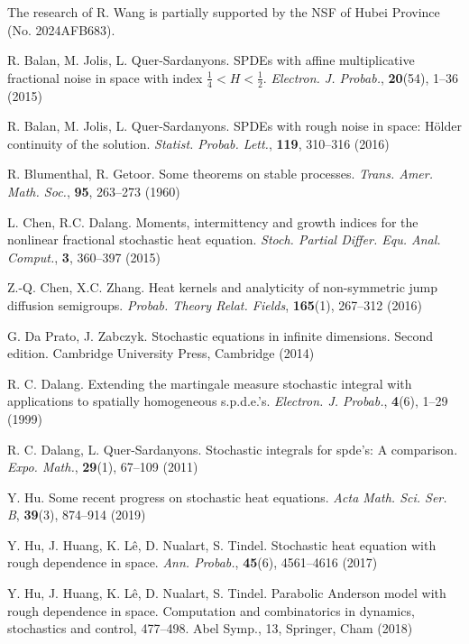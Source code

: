 \documentclass[11pt,reqno]{amsart}
\numberwithin{equation}{section}
\newcommand{\1}{{\bf 1}}
\newcommand{\2}{{\bf 2}}
\begin{document}
 \vskip0.2cm
  

 
  The research of R. Wang is partially supported by the NSF of Hubei Province (No. 2024AFB683).
 
 
 \vskip0.2cm
  
 
\begin{thebibliography}{}
R. Balan, M. Jolis, L. Quer-Sardanyons. SPDEs with affine multiplicative fractional noise in space with index $\frac{1}{4}<H<\frac{1}{2}$. {\it Electron. J. Probab.}, \textbf{20}(54), 1--36 (2015)

R. Balan, M. Jolis, L. Quer-Sardanyons. SPDEs with rough noise in space: H\"older continuity of the solution. {\it Statist. Probab. Lett.}, \textbf{119}, 310--316 (2016)

R. Blumenthal, R. Getoor. Some theorems on stable processes. {\it Trans. Amer. Math. Soc.}, \textbf{95}, 263--273 (1960)

L. Chen, R.C. Dalang. Moments, intermittency and growth indices for the nonlinear fractional stochastic heat equation. {\it Stoch. Partial Differ. Equ. Anal. Comput.}, \textbf{3}, 360--397 (2015)

Z.-Q. Chen, X.C. Zhang. Heat kernels and analyticity of non-symmetric jump diffusion semigroups. {\it Probab. Theory Relat. Fields}, \textbf{165}(1), 267--312 (2016)

G. Da Prato, J. Zabczyk. Stochastic equations in infinite dimensions. Second edition. Cambridge University Press, Cambridge (2014)

R. C. Dalang. Extending the martingale measure stochastic integral with applications to spatially homogeneous s.p.d.e.'s. {\it Electron. J. Probab.}, \textbf{4}(6), 1--29 (1999)

R. C. Dalang, L. Quer-Sardanyons. Stochastic integrals for spde's: A comparison. {\it Expo. Math.}, \textbf{29}(1), 67--109 (2011)

Y. Hu. Some recent progress on stochastic heat equations. {\it Acta Math. Sci. Ser. B}, \textbf{39}(3), 874--914 (2019)

Y. Hu, J. Huang, K. L\^e, D. Nualart, S. Tindel. Stochastic heat equation with rough dependence in space. {\it Ann. Probab.}, \textbf{45}(6), 4561--4616 (2017)

Y. Hu, J. Huang, K. L\^e, D. Nualart, S. Tindel. Parabolic Anderson model with rough dependence in space.  Computation and combinatorics in dynamics, stochastics and control, 477--498. Abel Symp., 13, Springer, Cham (2018)


\end{thebibliography}
\end{document}

